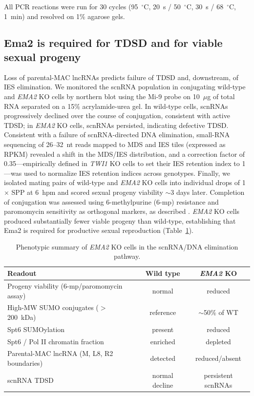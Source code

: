 \documentclass[11pt,a4paper]{article}
\begin{document}
All PCR reactions were run for 30 cycles (95~$^\circ$C, 20~s / 50~$^\circ$C, 30~s / 68~$^\circ$C, 1~min) and resolved on 1\% agarose gels.

\subsection{Ema2 is required for TDSD and for viable sexual progeny}
Loss of parental-MAC lncRNAs predicts failure of TDSD and, downstream, of IES elimination. We monitored the scnRNA population in conjugating wild-type and \textit{EMA2} KO cells by northern blot using the Mi-9 probe on 10~$\mu$g of total RNA separated on a 15\% acrylamide-urea gel. In wild-type cells, scnRNAs progressively declined over the course of conjugation, consistent with active TDSD; in \textit{EMA2} KO cells, scnRNAs persisted, indicating defective TDSD. Consistent with a failure of scnRNA-directed DNA elimination, small-RNA sequencing of 26--32~nt reads mapped to MDS and IES tiles (expressed as RPKM) revealed a shift in the MDS/IES distribution, and a correction factor of 0.35---empirically defined in \textit{TWI1} KO cells to set their IES retention index to 1---was used to normalize IES retention indices across genotypes. Finally, we isolated mating pairs of wild-type and \textit{EMA2} KO cells into individual drops of 1$\times$ SPP at 6~hpm and scored sexual progeny viability $\sim$3 days later. Completion of conjugation was assessed using 6-methylpurine (6-mp) resistance and paromomycin sensitivity as orthogonal markers, as described \citep{Mochizuki2002}. \textit{EMA2} KO cells produced substantially fewer viable progeny than wild-type, establishing that Ema2 is required for productive sexual reproduction (Table~\ref{tab:phen}).

\begin{table}[h]
\centering
\caption{Phenotypic summary of \textit{EMA2} KO cells in the scnRNA/DNA elimination pathway.}
\label{tab:phen}
\begin{tabular}{lcc}
\toprule
Readout & Wild type & \textit{EMA2} KO \\
\midrule
Progeny viability (6-mp/paromomycin assay)         & normal            & reduced \\
High-MW SUMO conjugates ($>$200~kDa)               & reference         & $\sim$50\% of WT \\
Spt6 SUMOylation                                   & present           & reduced \\
Spt6 / Pol II chromatin fraction                   & enriched          & depleted \\
Parental-MAC lncRNA (M, L8, R2 boundaries)         & detected          & reduced/absent \\
scnRNA TDSD                                        & normal decline    & persistent scnRNAs \\
\bottomrule
\end{tabular}
\end{table}
\end{document}
